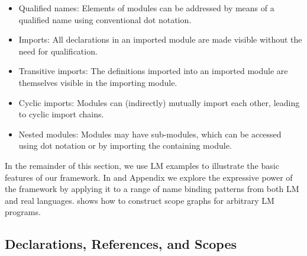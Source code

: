 \begin{itemize}
  \item Qualified names: Elements of modules can be addressed by means of a
  qualified name using conventional dot notation. 
  \item Imports: All declarations in an imported module are made visible without 
    the need for qualification.
  \item Transitive imports: The definitions imported into an imported module are
  themselves visible in the importing module.
  \item Cyclic imports: Modules can (indirectly) mutually import each other,
  leading to cyclic import chains.
  \item Nested modules: Modules may have sub-modules, which can be accessed using
  dot notation or by importing the containing module.
\end{itemize}



\noindent
In the remainder of this section, we use LM examples to illustrate the basic
features of our framework.  In  and 
Appendix  we explore the expressive
power of the framework by applying it to a range of name binding patterns
from both LM and real languages.
 shows how to 
construct scope graphs for arbitrary LM programs. 

\subsection{Declarations, References, and Scopes}

